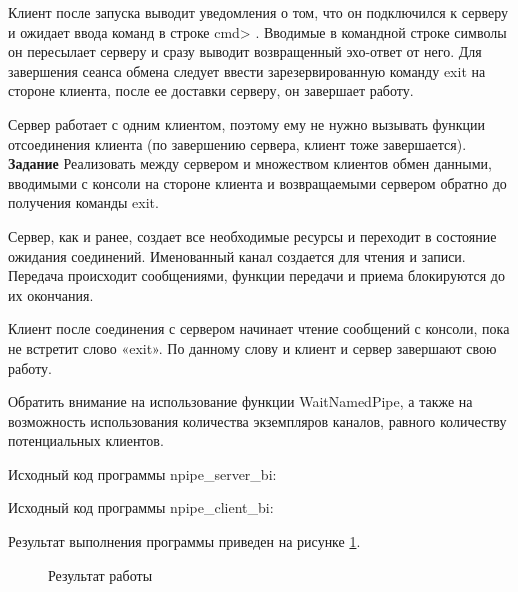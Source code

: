 \documentclass[a4paper]{article}
\begin{document}
	Клиент после запуска выводит уведомления о том, что он подключился к серверу и ожидает ввода команд в строке cmd> . Вводимые в командной строке символы он пересылает серверу и сразу выводит возвращенный эхо-ответ от него. Для завершения сеанса обмена следует ввести зарезервированную команду exit на стороне клиента, после ее доставки серверу, он завершает работу.
	
	Сервер работает с одним клиентом, поэтому ему не нужно вызывать функции отсоединения клиента (по завершению сервера, клиент тоже завершается).\\
	
	\textbf{Задание} Реализовать между сервером и множеством клиентов обмен данными, вводимыми с консоли на стороне клиента и возвращаемыми сервером обратно до получения команды exit.
	
	Сервер, как и ранее, создает все необходимые ресурсы и переходит в состояние ожидания соединений. Именованный канал создается для чтения и записи. Передача происходит сообщениями, функции передачи и приема блокируются до их окончания.
	
	Клиент после соединения с сервером начинает чтение сообщений с консоли, пока не встретит слово «exit». По данному слову и клиент и сервер завершают свою работу.
	
	Обратить внимание на использование функции WaitNamedPipe, а также на возможность использования количества экземпляров каналов, равного количеству потенциальных клиентов.
	
	Исходный код программы npipe\_server\_bi:
	
	
	
	Исходный код программы npipe\_client\_bi:
	
	
	Результат выполнения программы приведен на рисунке \ref{img:task4}.
	\begin{figure}[h!]
		\caption{Результат работы}
		\label{img:task4}
	\end{figure}
	
\end{document}
